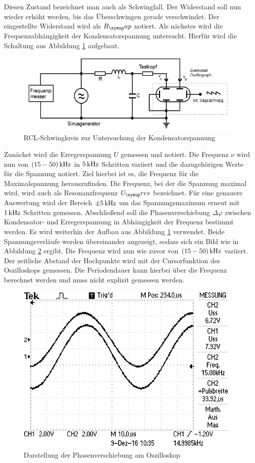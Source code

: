 Diesen Zustand bezeichnet man auch als Schwingfall. Der Widerstand soll nun
wieder erhöht werden, bis das Überschwingen gerade verschwindet. Der eingestellte
Widerstand wird als $R_\su{ap}$ notiert.
\newpage
Als nächstes wird die Frequenzabhängigkeit der Kondensatorspannung untersucht.
Hierfür wird die Schaltung aus Abbildung \ref{fig:phaseschlt} aufgebaut.
\begin{figure}[h]
  \centering
  \includegraphics[width=\textwidth]{Bilder/Phaseschalt.JPG}
  \caption{RCL-Schwingkreis zur Untersuchung der Kondensatorspannung\,\cite{354}}
  \label{fig:phaseschlt}
\end{figure}
Zunächst wird die Erregerspannung $U$ gemessen und notiert. Die Frequenz $\nu$
wird nun von $(15-50)\,\si{\kilo\hertz}$ in $5\,\si{\kilo\hertz}$ Schritten variiert und die dazugehörigen
Werte für die Spannung notiert. Ziel hierbei ist es, die Frequenz für die
Maximalspannung herauszufinden. Die Frequenz, bei der die Spannung maximal wird,
wird auch als Resonanzfrequenz $U_\su{res}$ bezeichnet. Für eine genauere
Auswertung wird der Bereich $\pm 5\,\si{\kilo\hertz}$ um das Spannungsmaximum erneut mit $1\,\si{\kilo\hertz}$
Schritten gemessen.
Abschließend soll die Phasenverschiebung $\Delta\varphi$ zwischen
Kondensator- und Erregerspannung in Abhängigkeit der Frequenz
bestimmt werden. Es wird weiterhin der Aufbau aus Abbildung
\ref{fig:phaseschlt} verwendet. Beide Spannungsverläufe werden übereinander
angezeigt, sodass sich ein Bild wie in Abbildung \ref{fig:dphi} ergibt. Die
Frequenz wird nun wie zuvor von $(15-50)\,\si{\kilo\hertz}$ variiert. Der zeitliche Abstand
der Hochpunkte wird mit der Cursorfunktion des Oszilloskops gemessen. Die
Periodendauer kann hierbei über die Frequenz berechnet werden und muss nicht
explizit gemessen werden.
\begin{figure}
  \centering
  \includegraphics[angle=90]{Bilder/dphi.JPG}
  \caption{Darstellung der Phasenverschiebung am Oszilloskop}
  \label{fig:dphi}
\end{figure}
